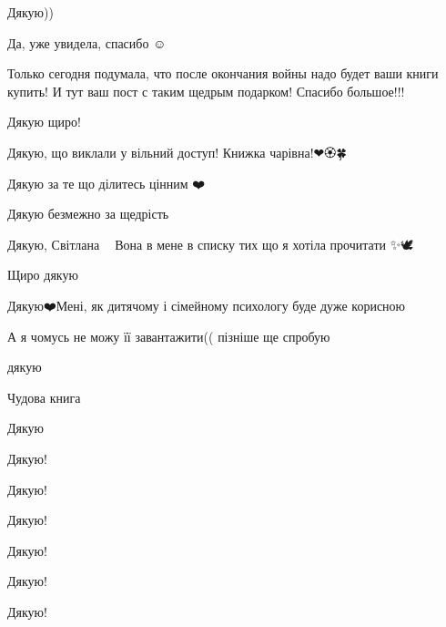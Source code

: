 Дякую))


Да, уже увидела, спасибо ☺️


Только сегодня подумала, что после окончания войны надо будет ваши книги
купить! И тут ваш пост с таким щедрым подарком! Спасибо большое!!!


Дякую щиро!


Дякую, що виклали у вільний доступ! Книжка чарівна!❤🏵🍀


Дякую за те що ділитесь цінним ❤️


Дякую безмежно за щедрість


Дякую, Світлана 🙏💕 Вона в мене в списку тих що я хотіла прочитати ✨🕊️


Щиро дякую 🙏


Дякую❤️Мені, як дитячому і сімейному психологу буде дуже корисною


А я чомусь не можу її завантажити(( пізніше ще спробую


дякую


Чудова книга💙


Дякую


Дякую!


Дякую!


Дякую!


Дякую!


Дякую!


Дякую!

